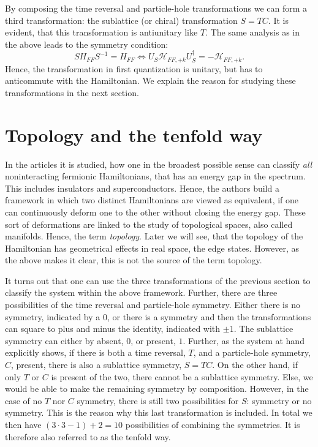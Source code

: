 By composing the time reversal and particle-hole transformations we can form a third transformation: the sublattice (or chiral) transformation $S = TC$. It is evident, that this transformation is antiunitary like $T$. The same analysis as in the above leads to the symmetry condition:
\begin{equation}
SH_{FF}S^{-1} = H_{FF} \Leftrightarrow U_S\mathcal{H}_{FF,+k} U^\dagger_S = - \mathcal{H}_{FF,+k}.
\end{equation}
Hence, the transformation in first quantization is unitary, but has to anticommute with the Hamiltonian. We explain the reason for studying these transformations in the next section.

\section{Topology and the tenfold way} \label{sec.Topology10foldway}
In the articles \cite{Ludwig.Topology, Chiu.Topology} it is studied, how one in the broadest possible sense can classify \textit{all} noninteracting fermionic Hamiltonians, that has an energy gap in the spectrum. This includes insulators and superconductors. Hence, the authors build a framework in which two distinct Hamiltonians are viewed as equivalent, if one can continuously deform one to the other without closing the energy gap. These sort of deformations are linked to the study of topological spaces, also called manifolds. Hence, the term \textit{topology}. Later we will see, that the topology of the Hamiltonian has geometrical effects in real space, the edge states. However, as the above makes it clear, this is not the source of the term topology.  

It turns out that one can use the three transformations of the previous section to classify the system within the above framework. Further, there are three possibilities of the time reversal and particle-hole symmetry. Either there is no symmetry, indicated by a $0$, or there is a symmetry and then the transformations can square to plus and minus the identity, indicated with $\pm 1$. The sublattice symmetry can either by absent, $0$, or present, $1$. Further, as the system at hand explicitly shows, if there is both a time reversal, $T$, and a particle-hole symmetry, $C$, present, there is also a sublattice symmetry, $S=TC$. On the other hand, if only $T$ or $C$ is present of the two, there cannot be a sublattice symmetry. Else, we would be able to make the remaining symmetry by composition. However, in the case of no $T$ nor $C$ symmetry, there is still two possibilities for $S$: symmetry or no symmetry. This is the reason why this last transformation is included. In total we then have $(3\cdot 3 - 1) + 2 = 10$ possibilities of combining the symmetries. It is therefore also referred to as the tenfold way. 

